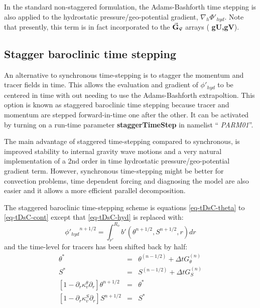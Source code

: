 In the standard non-staggered formulation, the Adams-Bashforth time
stepping is also applied to the hydrostatic pressure/geo-potential
gradient, $\nabla_h \Phi'_{hyd}$.  Note that presently, this term is in
fact incorporated to the $\vec{\bf G}_{\vec{\bf v}}$ arrays ({\bf
gU,gV}).






\subsection{Stagger baroclinic time stepping}

An alternative to synchronous time-stepping is to stagger the momentum
and tracer fields in time. This allows the evaluation and gradient of
$\phi'_{hyd}$ to be centered in time with out needing to use the
Adams-Bashforth extrapoltion. This option is known as staggered
baroclinic time stepping because tracer and momentum are stepped
forward-in-time one after the other.  It can be activated by turning
on a run-time parameter {\bf staggerTimeStep} in namelist ``{\it
PARM01}''.

The main advantage of staggered time-stepping compared to synchronous,
is improved stability to internal gravity wave motions and a very
natural implementation of a 2nd order in time hydrostatic
pressure/geo-potential gradient term. However, synchronous
time-stepping might be better for convection problems, time dependent
forcing and diagnosing the model are also easier and it allows a more
efficient parallel decomposition.

The staggered baroclinic time-stepping scheme is equations
\ref{eq-tDsC-theta} to \ref{eq-tDsC-cont} except that \ref{eq-tDsC-hyd} is replaced with:
\begin{equation}
{\phi'_{hyd}}^{n+1/2} = \int_{r'}^{R_o} b'(\theta^{n+1/2},S^{n+1/2},r)
dr
\end{equation}
and the time-level for tracers has been shifted back by half:
\begin{eqnarray*}
\theta^* & = &
\theta ^{(n-1/2)} + \Delta t G_{\theta} ^{(n)}
\\
S^* & = &
S ^{(n-1/2)} + \Delta t G_{S} ^{(n)}
\\
\left[ 1 - \partial_r \kappa_v^\theta \partial_r \right]
\theta^{n+1/2} & = & \theta^*
\\
\left[ 1 - \partial_r \kappa_v^S \partial_r \right]
S^{n+1/2} & = & S^*
\end{eqnarray*}


